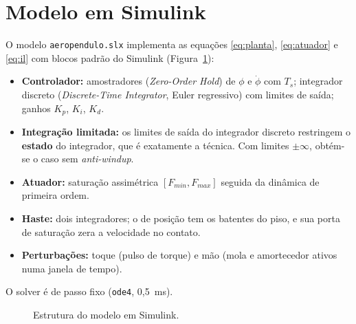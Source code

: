 \documentclass[a4paper,11pt]{article}
\begin{document}
\section{Modelo em Simulink}
\label{sec:simulink}

O modelo \texttt{aeropendulo.slx} implementa as equações \eqref{eq:planta}, \eqref{eq:atuador} e
\eqref{eq:il} com blocos padrão do Simulink (Figura~\ref{fig:simulink}):
\begin{itemize}
  \item \textbf{Controlador:} amostradores (\textit{Zero-Order Hold}) de $\phi$ e $\dot\phi$ com $T_s$;
    integrador discreto (\textit{Discrete-Time Integrator}, Euler regressivo) com limites de saída;
    ganhos $K_p$, $K_i$, $K_d$.
  \item \textbf{Integração limitada:} os limites de saída do integrador discreto restringem o
    \textbf{estado} do integrador, que é exatamente a técnica. Com limites $\pm\infty$, obtém-se o
    caso sem \textit{anti-windup}.
  \item \textbf{Atuador:} saturação assimétrica $[F_{min},F_{max}]$ seguida da dinâmica de primeira
    ordem.
  \item \textbf{Haste:} dois integradores; o de posição tem os batentes do piso, e sua porta de
    saturação zera a velocidade no contato.
  \item \textbf{Perturbações:} toque (pulso de torque) e mão (mola e amortecedor ativos numa janela de
    tempo).
\end{itemize}
O solver é de passo fixo (\texttt{ode4}, 0,5~ms).

\begin{figure}[H]
\centering
{}
\caption{Estrutura do modelo em Simulink.}
\label{fig:simulink}
\end{figure}
\end{document}
